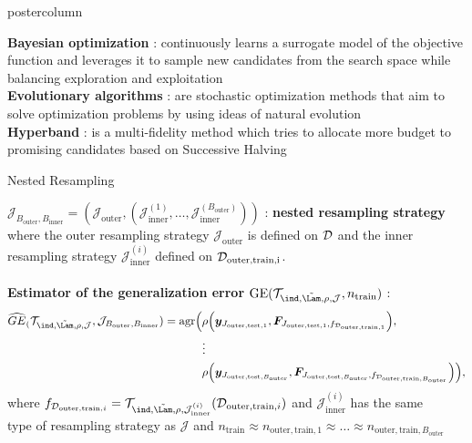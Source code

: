 \documentclass{beamer}
\begin{document}
\begin{frame}[fragile]{}
\begin{columns}
\begin{column}{.31\textwidth}
\begin{beamercolorbox}[center]{postercolumn}
\begin{minipage}{.98\textwidth}
{\textbf{Bayesian optimization} : continuously learns a surrogate model of the objective function and leverages it to sample new candidates from the search space while balancing exploration and exploitation\\

\textbf{Evolutionary algorithms} : are stochastic optimization methods that aim to solve optimization problems by using ideas of natural evolution\\

\textbf{Hyperband} : is a multi-fidelity method which tries to allocate more budget to promising candidates based on Successive Halving \\

\begin{myblock}{Nested Resampling}

$\mathcal{J}_{B_\mathrm{outer},B_\mathrm{inner}} = \left(\mathcal{J}_{\mathrm{outer}}, \left(\mathcal{J}_{\mathrm{inner}}^{(1)},\dots,\mathcal{J}_{\mathrm{inner}}^{(B_\mathrm{outer})}
\right)\right)$ : \textbf{nested resampling strategy} where the outer resampling strategy  $\mathcal{J}_{\mathrm{outer}}$ is defined on $\mathcal{D}$ and the inner resampling strategy $\mathcal{J}_{\mathrm{inner}}^{(i)}$ defined on $\mathcal{D}_{\textrm{outer,train,i}}$. \\\\
\textbf{Estimator of the generalization error} $\mathrm{GE}(\mathcal{T}_{\ind, \LamS, \rho, \mathcal{J}}, n_\mathrm{train})$ :
\begin{equation*}
\begin{split}
\GEh(\mathcal{T}_{\ind, \LamS, \rho, \mathcal{J}}, \mathcal{J}_{B_\mathrm{outer},B_\mathrm{inner}}) = \mathrm{agr}\Big(
 &\rho\Big(\boldsymbol{y}_{J_{\mathrm{outer,test},1}}, \boldsymbol{F}_{J_{\mathrm{outer,test},1},f_{\mathcal{D}_{\mathrm{outer,train},1}}}\Big), \\ &\large{\vdots} \\
& \rho\Big(\boldsymbol{y}_{J_{\mathrm{outer,test},B_\mathrm{outer} }}, \boldsymbol{F}_{J_{\mathrm{outer,test},B_\mathrm{outer}},
f_{\mathcal{D}_{\mathrm{outer,train},B_\mathrm{outer}}}}\Big)
    \Big),
\end{split}
\end{equation*}
where $f_{\mathcal{D}_{\mathrm{outer,train},i}} = \mathcal{T}_{\ind,\LamS,\rho,\mathcal{J}_{\mathrm{inner}}^{(i)}}(\mathcal{D}_{\mathrm{outer,train},i})$ and
$\mathcal{J}_{\mathrm{inner}}^{(i)}$ has the same \\ type of resampling strategy as $\mathcal{J}$ and
$n_{\mathrm{train}} \approx n_{\mathrm{outer,train},1} \approx \dots \approx n_{\mathrm{outer,train},B_\mathrm{outer}}$


\end{myblock}}
\end{minipage}
\end{beamercolorbox}
\end{column}
\end{columns}
\end{frame}
\end{document}
